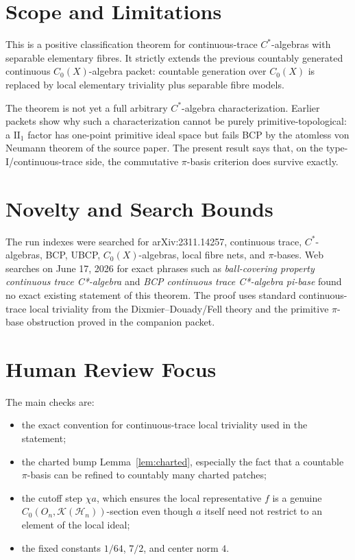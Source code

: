\documentclass[11pt]{article}
\newcommand{\Kcal}{\mathcal K}
\begin{document}
\section*{Scope and Limitations}

This is a positive classification theorem for continuous-trace
\(C^*\)-algebras with separable elementary fibres.  It strictly extends the
previous countably generated continuous \(C_0(X)\)-algebra packet: countable
generation over \(C_0(X)\) is replaced by local elementary triviality plus
separable fibre models.

The theorem is not yet a full arbitrary \(C^*\)-algebra characterization.
Earlier packets show why such a characterization cannot be purely
primitive-topological: a \(\mathrm{II}_1\) factor has one-point primitive
ideal space but fails BCP by the atomless von Neumann theorem of the source
paper.  The present result says that, on the type-I/continuous-trace side, the
commutative \(\pi\)-basis criterion does survive exactly.

\section*{Novelty and Search Bounds}

The run indexes were searched for arXiv:2311.14257, continuous trace,
\(C^*\)-algebras, BCP, UBCP, \(C_0(X)\)-algebras, local fibre nets, and
\(\pi\)-bases.  Web searches on June 17, 2026 for exact phrases such as
\emph{ball-covering property continuous trace C*-algebra} and
\emph{BCP continuous trace C*-algebra pi-base} found no exact existing
statement of this theorem.  The proof uses standard continuous-trace local
triviality from the Dixmier--Douady/Fell theory and the primitive \(\pi\)-base
obstruction proved in the companion packet.

\section*{Human Review Focus}

The main checks are:
\begin{itemize}
    \item the exact convention for continuous-trace local triviality used in
    the statement;
    \item the charted bump Lemma~\ref{lem:charted}, especially the fact that a
    countable \(\pi\)-basis can be refined to countably many charted patches;
    \item the cutoff step \(\chi a\), which ensures the local representative
    \(f\) is a genuine \(C_0(O_n,\Kcal(\mathcal H_n))\)-section even though
    \(a\) itself need not restrict to an element of the local ideal;
    \item the fixed constants \(1/64\), \(7/2\), and center norm \(4\).
\end{itemize}
\end{document}
